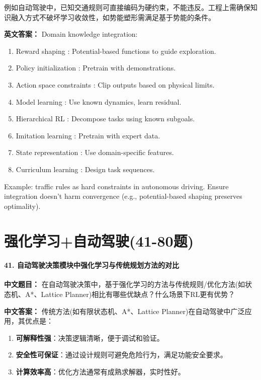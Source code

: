 \documentclass[10pt,a4paper]{ctexart}
\begin{document}
例如自动驾驶中，已知交通规则可直接编码为硬约束，不能违反。工程上需确保知识融入方式不破坏学习收敛性，如势能塑形需满足基于势能的条件。

\textbf{英文答案：}  
Domain knowledge integration:
\begin{enumerate}
    \item Reward shaping : Potential-based functions to guide exploration.
    \item Policy initialization : Pretrain with demonstrations.
    \item Action space constraints : Clip outputs based on physical limits.
    \item Model learning : Use known dynamics, learn residual.
    \item Hierarchical RL : Decompose tasks using known subgoals.
    \item Imitation learning : Pretrain with expert data.
    \item State representation : Use domain-specific features.
    \item Curriculum learning : Design task sequences.
\end{enumerate}

Example: traffic rules as hard constraints in autonomous driving. Ensure integration doesn't harm convergence (e.g., potential-based shaping preserves optimality).

\part{强化学习+自动驾驶(41-80题)}

\subsection*{41. 自动驾驶决策模块中强化学习与传统规划方法的对比}
\textbf{中文题目：} 在自动驾驶决策中，基于强化学习的方法与传统规则/优化方法(如状态机、A*、Lattice Planner)相比有哪些优缺点？什么场景下RL更有优势？

\textbf{中文答案：}  
传统方法(如有限状态机、A*、Lattice Planner)在自动驾驶中广泛应用，其优点是：
\begin{enumerate}
    \item \textbf{可解释性强}：决策逻辑清晰，便于调试和验证。
    \item \textbf{安全性可保证}：通过设计规则可避免危险行为，满足功能安全要求。
    \item \textbf{计算效率高}：优化方法通常有成熟求解器，实时性好。
\end{enumerate}
\end{document}
